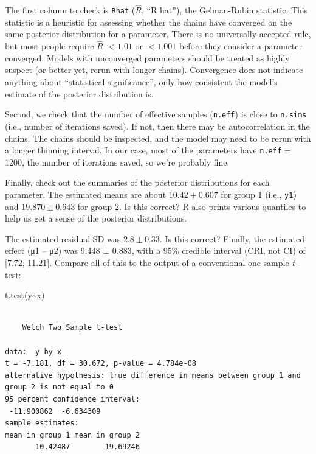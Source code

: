 \documentclass[
  13,
  letterpaper,
]{report}
\newenvironment{Shaded}{\begin{snugshade}}{\end{snugshade}}
\newcommand{\FunctionTok}[1]{\textcolor[rgb]{0.28,0.35,0.67}{#1}}
\newcommand{\NormalTok}[1]{\textcolor[rgb]{0.00,0.23,0.31}{#1}}
\newcommand{\SpecialCharTok}[1]{\textcolor[rgb]{0.37,0.37,0.37}{#1}}
\begin{document}
The first column to check is \texttt{Rhat} (\(\hat{R}\), ``R hat''), the
Gelman-Rubin statistic. This statistic is a heuristic for assessing
whether the chains have converged on the same posterior distribution for
a parameter. There is no universally-accepted rule, but most people
require \(\hat{R}\) \(< 1.01\) or \(<1.001\) before they consider a
parameter converged. Models with unconverged parameters should be
treated as highly suspect (or better yet, rerun with longer chains).
Convergence does not indicate anything about ``statistical
significance'', only how consistent the model's estimate of the
posterior distribution is.

Second, we check that the number of effective samples (\texttt{n.eff})
is close to \texttt{n.sims} (i.e., number of iterations saved). If not,
then there may be autocorrelation in the chains. The chains should be
inspected, and the model may need to be rerun with a longer thinning
interval. In our case, most of the parameters have \texttt{n.eff} =
1200, the number of iterations saved, so we're probably fine.

Finally, check out the summaries of the posterior distributions for each
parameter. The estimated means are about \(10.42\pm0.607\) for group 1
(i.e., \texttt{y1}) and \(19.870\pm0.643\) for group 2. Is this correct?
R also prints various quantiles to help us get a sense of the posterior
distributions.

The estimated residual SD was \(2.8\pm0.33\). Is this correct? Finally,
the estimated effect (μ1 -- μ2) was 9.448 ± 0.883, with a 95\% credible
interval (CRI, not CI) of {[}7.72, 11.21{]}. Compare all of this to the
output of a conventional one-sample \emph{t}-test:

\begin{Shaded}
\begin{Highlighting}[]
\FunctionTok{t.test}\NormalTok{(y}\SpecialCharTok{\textasciitilde{}}\NormalTok{x)}
\end{Highlighting}
\end{Shaded}

\begin{verbatim}

    Welch Two Sample t-test

data:  y by x
t = -7.181, df = 30.672, p-value = 4.784e-08
alternative hypothesis: true difference in means between group 1 and group 2 is not equal to 0
95 percent confidence interval:
 -11.900862  -6.634309
sample estimates:
mean in group 1 mean in group 2 
       10.42487        19.69246 
\end{verbatim}
\end{document}
